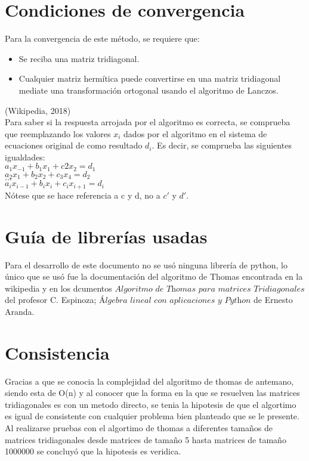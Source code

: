 \documentclass{article}
\begin{document}
\newpage

\section{Condiciones de convergencia}
Para la convergencia de este método, se requiere que:\\
\begin{itemize}
    \item Se reciba una matriz tridiagonal.
    \item Cualquier matriz hermítica puede convertirse en una matriz tridiagonal mediate una transformación ortogonal usando el algoritmo de Lanczos.
\end{itemize}
(Wikipedia, 2018)\\
Para saber si la respuesta arrojada por el algoritmo es correcta, se comprueba que reemplazando los valores $x_{i}$ dados por el algoritmo en el sistema de ecuaciones original de como resultado $d_{i}$. Es decir, se comprueba las siguientes igualdades:\\
$a_{1}x_{-1} + b_{1}x_{1} + c{2}x_{2} = d_{1}$\\
$a_{2}x_{1} + b_{2}x_{2} + c_{3}x_{4} = d_{2}$\\
$...$\\
$a_{i}x_{i - 1} + b_{i}x_{i} + c_{i}x_{i + 1} = d_{i}$\\
Nótese que se hace referencia a c y d, no a $c'$ y $d'$.
\section{Guía de librerías usadas}
Para el desarrollo de este documento no se usó ninguna librería de python, lo único que se usó fue la documentación del algoritmo de Thomas encontrada en la wikipedia y en los dcumentos $\textit{Algoritmo de Thomas para matrices Tridiagonales}$ del profesor C. Espinoza; $\textit{Álgebra lineal con aplicaciones y Python}$ de Ernesto Aranda.
\section{Consistencia}

Gracias a que se conocia la complejidad del algoritmo de thomas de antemano, siendo esta de O(n) y al conocer que la forma en la que se resuelven las matrices tridiagonales es con un metodo directo, se tenia la hipotesis de que el algortimo es igual de consistente con cualquier problema bien planteado que se le presente.\\ Al realizarse pruebas con el algortimo de thomas a diferentes tamaños de matrices tridiagonales desde matrices de tamaño 5 hasta matrices de tamaño 1000000 se concluyó que la hipotesis es veridica.
\end{document}

